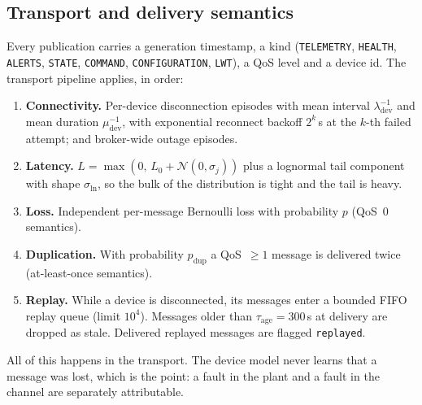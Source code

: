 \documentclass[preprint,12pt,authoryear,nopreprintline]{elsarticle}
\begin{document}
\subsection{Transport and delivery semantics}
\label{sec:transport}
Every publication carries a generation timestamp, a kind
(\texttt{TELEMETRY}, \texttt{HEALTH}, \texttt{ALERTS}, \texttt{STATE},
\texttt{COMMAND}, \texttt{CONFIGURATION}, \texttt{LWT}), a QoS level and a device
id. The transport pipeline applies, in order:
\begin{enumerate}
  \item \textbf{Connectivity.} Per-device disconnection episodes with mean
        interval $\lambda_{\mathrm{dev}}^{-1}$ and mean duration
        $\mu_{\mathrm{dev}}^{-1}$, with exponential reconnect backoff
        $2^{k}$\,s at the $k$-th failed attempt; and broker-wide outage episodes.
  \item \textbf{Latency.} $L = \max(0,\,L_0 + \mathcal{N}(0,\sigma_j))$ plus a
        lognormal tail component with shape $\sigma_{\ln}$, so the bulk of the
        distribution is tight and the tail is heavy.
  \item \textbf{Loss.} Independent per-message Bernoulli loss with probability
        $p$ (QoS~0 semantics).
  \item \textbf{Duplication.} With probability $p_{\mathrm{dup}}$ a
        QoS~$\ge 1$ message is delivered twice (at-least-once semantics).
  \item \textbf{Replay.} While a device is disconnected, its messages enter a
        bounded FIFO replay queue (limit $10^{4}$). Messages older than
        $\tau_{\mathrm{age}} = 300$\,s at delivery are dropped as stale.
        Delivered replayed messages are flagged \texttt{replayed}.
\end{enumerate}
All of this happens in the transport. The device model never learns that a
message was lost, which is the point: a fault in the plant and a fault in the
channel are separately attributable.
\end{document}
